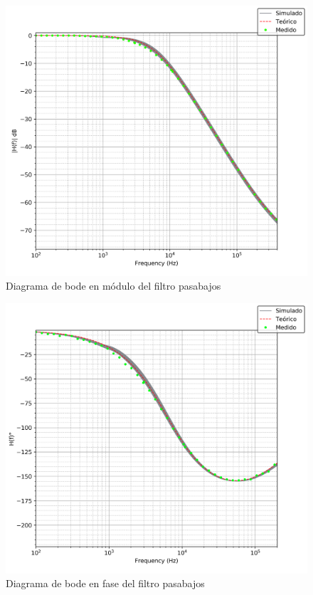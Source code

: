 \begin{figure}[H]
    \centering
        \includegraphics[scale=0.5]{../EJ2/Recursos/bode_pasabajos_modulo.png}
    \caption{Diagrama de bode en m\'odulo del filtro pasabajos}
    \label{fig:bode_pasabajos_modulo}
\end{figure}

\begin{figure}[H]
    \centering
        \includegraphics[scale=0.5]{../EJ2/Recursos/bode_pasabajos_fase.png}
    \caption{Diagrama de bode en fase del filtro pasabajos}
    \label{fig:bode_pasabajos_fase}
\end{figure}

